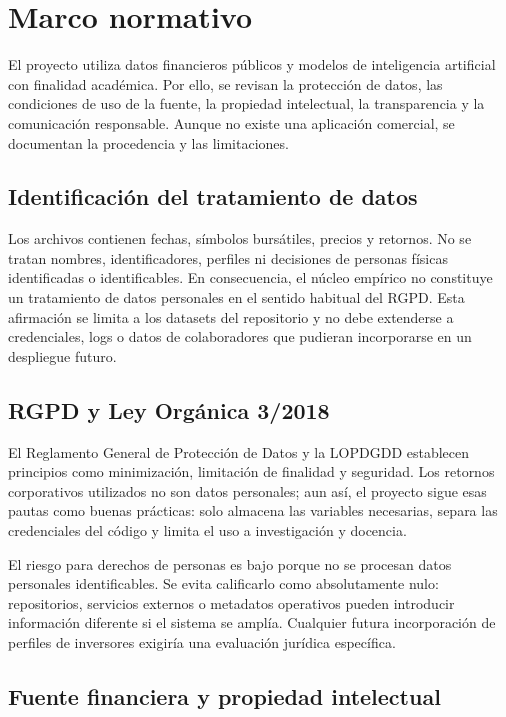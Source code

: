 \clearpage
\chapter{Marco normativo}

El proyecto utiliza datos financieros públicos y modelos de inteligencia artificial con finalidad académica. Por ello, se revisan la protección de datos, las condiciones de uso de la fuente, la propiedad intelectual, la transparencia y la comunicación responsable. Aunque no existe una aplicación comercial, se documentan la procedencia y las limitaciones.

\section{Identificación del tratamiento de datos}

Los archivos contienen fechas, símbolos bursátiles, precios y retornos. No se tratan nombres, identificadores, perfiles ni decisiones de personas físicas identificadas o identificables. En consecuencia, el núcleo empírico no constituye un tratamiento de datos personales en el sentido habitual del RGPD. Esta afirmación se limita a los datasets del repositorio y no debe extenderse a credenciales, logs o datos de colaboradores que pudieran incorporarse en un despliegue futuro.

\section{RGPD y Ley Orgánica 3/2018}

El Reglamento General de Protección de Datos y la LOPDGDD establecen principios como minimización, limitación de finalidad y seguridad. Los retornos corporativos utilizados no son datos personales; aun así, el proyecto sigue esas pautas como buenas prácticas: solo almacena las variables necesarias, separa las credenciales del código y limita el uso a investigación y docencia.

El riesgo para derechos de personas es bajo porque no se procesan datos personales identificables. Se evita calificarlo como absolutamente nulo: repositorios, servicios externos o metadatos operativos pueden introducir información diferente si el sistema se amplía. Cualquier futura incorporación de perfiles de inversores exigiría una evaluación jurídica específica.

\section{Fuente financiera y propiedad intelectual}

